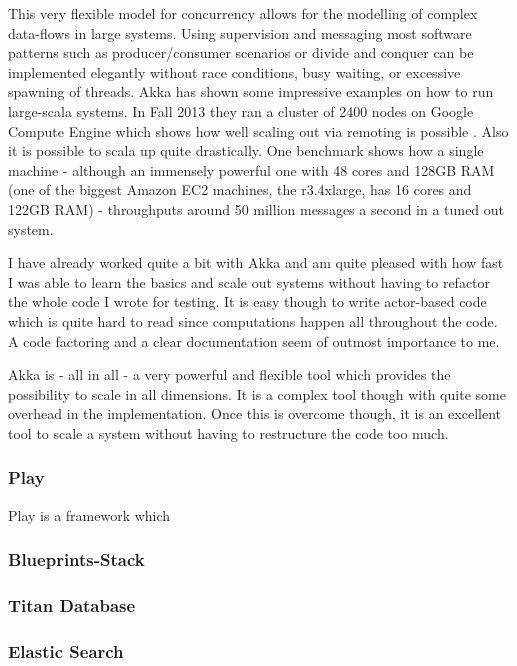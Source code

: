 \documentclass[11p]{scrartcl}
\begin{document}
This very flexible model for concurrency allows for the modelling of complex data-flows in large systems. Using supervision and messaging most software patterns such as producer/consumer scenarios or divide and conquer can be implemented elegantly without race conditions, busy waiting, or excessive spawning of threads. Akka has shown some impressive examples on how to run large-scala systems. In Fall 2013 they ran a cluster of 2400 nodes on Google Compute Engine which shows how well scaling out via remoting is possible \cite{link:akkaCluster}. Also it is possible to scala up quite drastically. One benchmark shows how a single machine - although an immensely powerful one with 48 cores and 128GB RAM (one of the biggest Amazon EC2 machines, the r3.4xlarge, has 16 cores and 122GB RAM) \cite{link:ec2Pricing} - throughputs around 50 million messages a second in a tuned out system. \cite{link:akkaScaleUp}

I have already worked quite a bit with Akka and am quite pleased with how fast I was able to learn the basics and scale out systems without having to refactor the whole code I wrote for testing. It is easy though to write actor-based code which is quite hard to read since computations happen all throughout the code. A code factoring and a clear documentation seem of outmost importance to me.

Akka is - all in all - a very powerful and flexible tool which provides the possibility to scale in all dimensions. It is a complex tool though with quite some overhead in the implementation. Once this is overcome though, it is an excellent tool to scale a system without having to restructure the code too much.


\subsubsection{Play}
Play is a framework which 


\subsubsection{Blueprints-Stack}
\subsubsection{Titan Database}
\subsubsection{Elastic Search}
	
\end{document}
